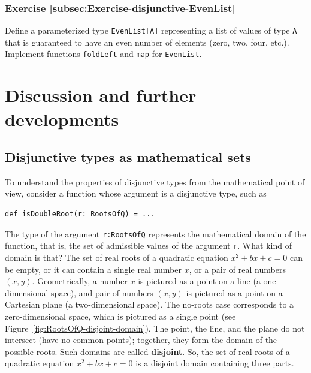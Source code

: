 \subsubsection{Exercise \label{subsec:Exercise-disjunctive-EvenList}\ref{subsec:Exercise-disjunctive-EvenList}}

Define a parameterized type \lstinline!EvenList[A]! representing
a list of values of type \lstinline!A! that is guaranteed to have
an even number of elements (zero, two, four, etc.). Implement functions
\lstinline!foldLeft! and \lstinline!map! for \lstinline!EvenList!.%

\section{Discussion and further developments}

\subsection{Disjunctive types as mathematical sets}

To understand the properties of disjunctive types from the mathematical
point of view, consider a function whose argument is a disjunctive
type, such as
\begin{lstlisting}
def isDoubleRoot(r: RootsOfQ) = ...
\end{lstlisting}
The type of the argument \lstinline!r:RootsOfQ! represents the mathematical
domain of the function, that is, the set of admissible values of the
argument \lstinline!r!. What kind of domain is that? The set of real
roots of a quadratic equation $x^{2}+bx+c=0$ can be empty, or it
can contain a single real number $x$, or a pair of real numbers $\left(x,y\right)$.
Geometrically, a number $x$ is pictured as a point on a line (a one-dimensional
space), and pair of numbers $\left(x,y\right)$ is pictured as a point
on a Cartesian plane (a two-dimensional space). The no-roots case
corresponds to a zero-dimensional space, which is pictured as a single
point (see Figure~\ref{fig:RootsOfQ-disjoint-domain}). The point,
the line, and the plane do not intersect (have no common points);
together, they form the domain of the possible roots. Such domains
are called \textbf{disjoint}. So, the set
of real roots of a quadratic equation $x^{2}+bx+c=0$ is a disjoint
domain containing three parts.

